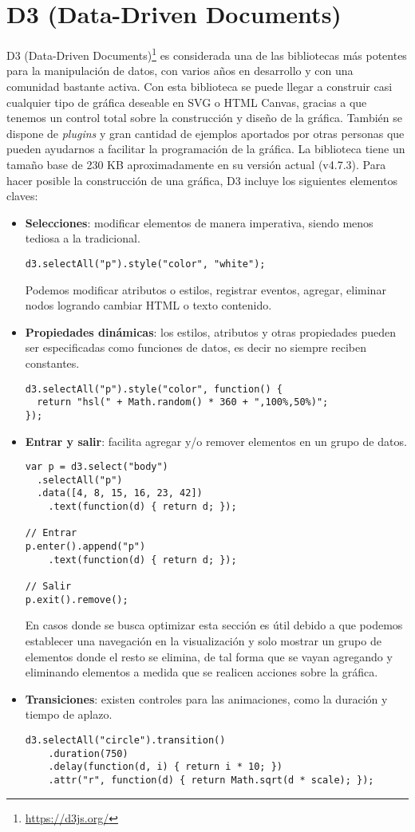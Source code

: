 \section{D3 (Data-Driven Documents)}
D3 (Data-Driven Documents)\footnote{\url{https://d3js.org/}} es considerada una de las bibliotecas más potentes para la manipulación de datos, con varios años en desarrollo y con una comunidad bastante activa. Con esta biblioteca se puede llegar a construir casi cualquier tipo de gráfica deseable en SVG o HTML Canvas, gracias a que tenemos un control total sobre la construcción y diseño de la gráfica. También se dispone de \textit{plugins} y gran cantidad de ejemplos aportados por otras personas que pueden ayudarnos a facilitar la programación de la gráfica. La biblioteca tiene un tamaño base de 230 KB aproximadamente en su versión actual (v4.7.3).
Para hacer posible la construcción de una gráfica, D3 incluye los siguientes elementos claves:
\begin{itemize}
\item\textbf{Selecciones}: modificar elementos de manera imperativa, siendo menos tediosa a la tradicional.
\begin{lstlisting}
d3.selectAll("p").style("color", "white");
\end{lstlisting}
Podemos modificar atributos o estilos, registrar eventos, agregar, eliminar nodos logrando cambiar HTML o texto contenido.

\item\textbf{Propiedades dinámicas}: los estilos, atributos y otras propiedades pueden ser especificadas como funciones de datos, es decir no siempre reciben constantes.
\begin{lstlisting}
d3.selectAll("p").style("color", function() {
  return "hsl(" + Math.random() * 360 + ",100%,50%)";
});
\end{lstlisting}

\item\textbf{Entrar y salir}: facilita agregar y/o remover elementos en un grupo de datos.
\begin{lstlisting}
var p = d3.select("body")
  .selectAll("p")
  .data([4, 8, 15, 16, 23, 42])
    .text(function(d) { return d; });

// Entrar
p.enter().append("p")
    .text(function(d) { return d; });

// Salir
p.exit().remove();
\end{lstlisting}
En casos donde se busca optimizar esta sección es útil debido a que podemos establecer una navegación en la visualización y solo mostrar un grupo de elementos donde el resto se elimina, de tal forma que se vayan agregando y eliminando elementos a medida que se realicen acciones sobre la gráfica. 

\item\textbf{Transiciones}: existen controles para las animaciones, como la duración y tiempo de aplazo.
\begin{lstlisting}
d3.selectAll("circle").transition()
    .duration(750)
    .delay(function(d, i) { return i * 10; })
    .attr("r", function(d) { return Math.sqrt(d * scale); });
\end{lstlisting}
\end{itemize}
